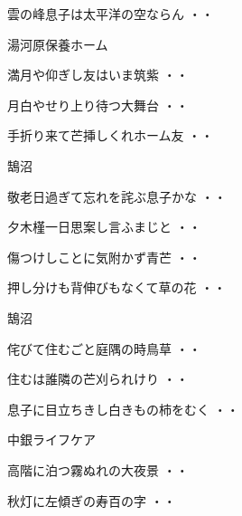 \begin{shiika}雲の峰息子は太平洋の空ならん
\hfill{・・}\end{shiika}
\vspace{0.4cm}
湯河原保養ホーム
\begin{shiika}満月や仰ぎし友はいま筑紫
\hfill{・・}\end{shiika}
\begin{shiika}月白やせり上り待つ大舞台
\hfill{・・}\end{shiika}
\begin{shiika}手折り来て芒挿しくれホーム友
\hfill{・・}\end{shiika}
\vspace{0.4cm}
鵠沼
\begin{shiika}敬老日過ぎて忘れを詫ぶ息子かな
\hfill{・・}\end{shiika}
\begin{shiika}夕木槿一日思案し言ふまじと
\hfill{・・}\end{shiika}
\begin{shiika}傷つけしことに気附かず青芒
\hfill{・・}\end{shiika}
\begin{shiika}押し分けも背伸びもなくて草の花
\hfill{・・}\end{shiika}
\vspace{0.4cm}
鵠沼
\begin{shiika}侘びて住むごと庭隅の時鳥草
\hfill{・・}\end{shiika}
\begin{shiika}住むは誰隣の芒刈られけり
\hfill{・・}\end{shiika}
\begin{shiika}息子に目立ちきし白きもの柿をむく
\hfill{・・}\end{shiika}
\vspace{0.4cm}
中銀ライフケア
\begin{shiika}高階に泊つ霧ぬれの大夜景
\hfill{・・}\end{shiika}
\begin{shiika}秋灯に左傾ぎの寿百の字
\hfill{・・}\end{shiika}
